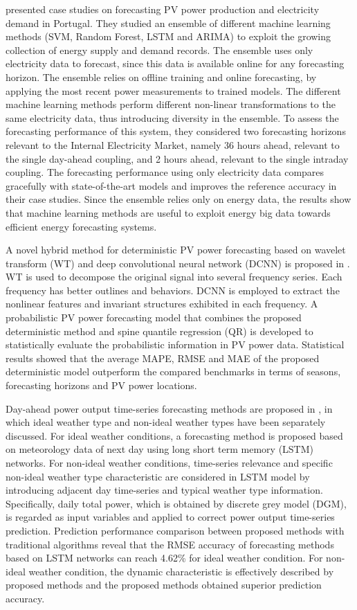 \cite{9248865} presented case studies on forecasting PV power production and electricity demand in Portugal.
They studied an ensemble of different machine learning methods (SVM, Random Forest, LSTM and ARIMA) to exploit the growing collection of energy supply and demand records.
The ensemble uses only electricity data to forecast, since this data is available online for any forecasting horizon.
The ensemble relies on offline training and online forecasting, by applying the most recent power measurements to trained models.
The different machine learning methods perform different non-linear transformations to the same electricity data, thus introducing diversity in the ensemble.
To assess the forecasting performance of this system, they considered two forecasting horizons relevant to the Internal Electricity Market, namely 36 hours ahead, relevant to the single day-ahead coupling, and 2 hours ahead, relevant to the single intraday coupling.
The forecasting performance using only electricity data compares gracefully with state-of-the-art models and improves the reference accuracy in their case studies.
Since the ensemble relies only on energy data, the results show that machine learning methods are useful to exploit energy big data towards efficient energy forecasting systems.

A novel hybrid method for deterministic PV power forecasting based on wavelet transform (WT) and deep convolutional neural network (DCNN) is proposed in \cite{WANG2017409}.
WT is used to decompose the original signal into several frequency series.
Each frequency has better outlines and behaviors.
DCNN is employed to extract the nonlinear features and invariant structures exhibited in each frequency.
A probabilistic PV power forecasting model that combines the proposed deterministic method and spine quantile regression (QR) is developed to statistically evaluate the probabilistic information in PV power data.
Statistical results showed that the average MAPE, RMSE and MAE of the proposed deterministic model outperform the compared benchmarks in terms of seasons, forecasting horizons and PV power locations.

Day-ahead power output time-series forecasting methods are proposed in \cite{GAO2019115838}, in which ideal weather type and non-ideal weather types have been separately discussed.
For ideal weather conditions, a forecasting method is proposed based on meteorology data of next day using long short term memory (LSTM) networks.
For non-ideal weather conditions, time-series relevance and specific non-ideal weather type characteristic are considered in LSTM model by introducing adjacent day time-series and typical weather type information.
Specifically, daily total power, which is obtained by discrete grey model (DGM), is regarded as input variables and applied to correct power output time-series prediction.
Prediction performance comparison between proposed methods with traditional algorithms reveal that the RMSE accuracy of forecasting methods based on LSTM networks can reach 4.62\% for ideal weather condition.
For non-ideal weather condition, the dynamic characteristic is effectively described by proposed methods and the proposed methods obtained superior prediction accuracy.

